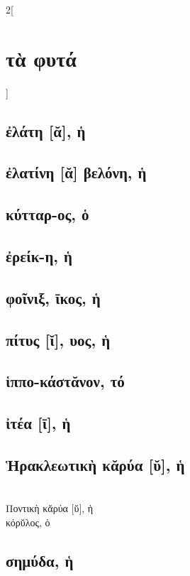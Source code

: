 \documentclass{book}
\begin{document}
\begin{multicols}{2}[\section{τὰ φυτά}]
\subsection{ἐλάτη [ᾰ], ἡ}
\subsection{ἐλατίνη [ᾰ] βελόνη, ἡ}
\subsection{κύτταρ-ος, ὁ}
\subsection{ἐρείκ-η, ἡ}
\subsection{φοῖνιξ, ῑκος, ἡ}
\subsection{πίτυς [ῐ], υος, ἡ}
\subsection{ἱππο-κάστᾰνον, τό}
\subsection{ἰτέα [ῑ], ἡ}
\subsection{Ἡρακλεωτικὴ κᾰρύα [ῠ], ἡ}
  ~\\
Ποντικὴ κᾰρύα [ῠ], ἡ
  ~\\
κόρῠλος, ὁ
\subsection{σημύδα, ἡ}
~
\end{multicols}
\newpage  
\end{document}
